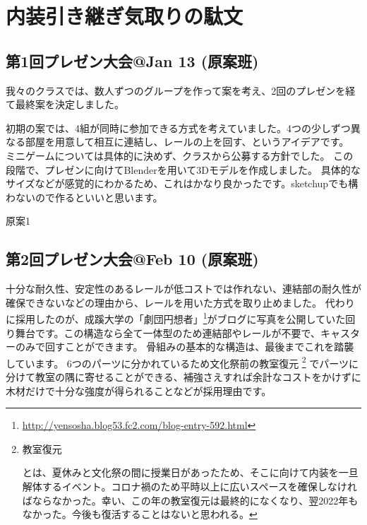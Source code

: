 \documentclass[uplatex,dvipdfmx]{jsreport}
\begin{document}
\chapter{内装引き継ぎ気取りの駄文}

\section{第1回プレゼン大会@Jan 13 (原案班)}

我々のクラスでは、数人ずつのグループを作って案を考え、2回のプレゼンを経て最終案を決定しました。

初期の案では、4組が同時に参加できる方式を考えていました。4つの少しずつ異なる部屋を用意して相互に連結し、レールの上を回す、というアイデアです。
ミニゲームについては具体的に決めず、クラスから公募する方針でした。
この段階で、プレゼンに向けてBlenderを用いて3Dモデルを作成しました。
具体的なサイズなどが感覚的にわかるため、これはかなり良かったです。sketchupでも構わないので作るといいと思います。

\begin{imageHere}{原案1}
\end{imageHere}

\clearpage

\section{第2回プレゼン大会@Feb 10 (原案班)}

十分な耐久性、安定性のあるレールが低コストでは作れない、連結部の耐久性が確保できないなどの理由から、レールを用いた方式を取り止めました。
代わりに採用したのが、成蹊大学の「劇団円想者」\footnote{\url{http://yensosha.blog53.fc2.com/blog-entry-592.html}}がブログに写真を公開していた回り舞台です。この構造なら全て一体型のため連結部やレールが不要で、キャスターのみで回すことができます。
骨組みの基本的な構造は、最後までこれを踏襲しています。
6つのパーツに分かれているため文化祭前の教室復元
    \footnote{\hypertarget{note:教室復元}{教室復元}とは、夏休みと文化祭の間に授業日があったため、そこに向けて内装を一旦解体するイベント。コロナ禍のため平時以上に広いスペースを確保しなければならなかった。幸い、この年の教室復元は最終的になくなり、翌2022年もなかった。今後も復活することはないと思われる。}
でパーツに分けて教室の隅に寄せることができる、補強さえすれば余計なコストをかけずに木材だけで十分な強度が得られることなどが採用理由です。
\end{document}
